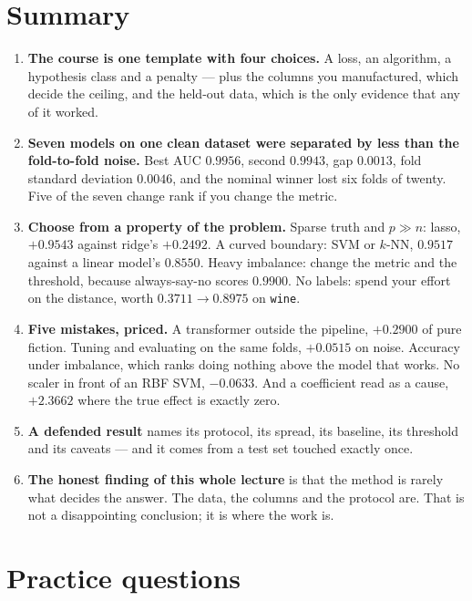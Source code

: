 \documentclass[11pt]{article}
\begin{document}
\section{Summary}
\label{sec:summary}

\begin{enumerate}[leftmargin=*]
  \item \textbf{The course is one template with four choices.} A loss, an
    algorithm, a hypothesis class and a penalty --- plus the columns you
    manufactured, which decide the ceiling, and the held-out data, which is
    the only evidence that any of it worked.
  \item \textbf{Seven models on one clean dataset were separated by less than
    the fold-to-fold noise.} Best AUC $0.9956$, second $0.9943$, gap
    $0.0013$, fold standard deviation $0.0046$, and the nominal winner lost
    six folds of twenty. Five of the seven change rank if you change the
    metric.
  \item \textbf{Choose from a property of the problem.} Sparse truth and
    $p \gg n$: lasso, $+0.9543$ against ridge's $+0.2492$. A curved boundary:
    SVM or $k$-NN, $0.9517$ against a linear model's $0.8550$. Heavy
    imbalance: change the metric and the threshold, because always-say-no
    scores $0.9900$. No labels: spend your effort on the distance, worth
    $0.3711 \to 0.8975$ on \texttt{wine}.
  \item \textbf{Five mistakes, priced.} A transformer outside the pipeline,
    $+0.2900$ of pure fiction. Tuning and evaluating on the same folds,
    $+0.0515$ on noise. Accuracy under imbalance, which ranks doing nothing
    above the model that works. No scaler in front of an RBF SVM,
    $-0.0633$. And a coefficient read as a cause, $+2.3662$ where the true
    effect is exactly zero.
  \item \textbf{A defended result} names its protocol, its spread, its
    baseline, its threshold and its caveats --- and it comes from a test set
    touched exactly once.
  \item \textbf{The honest finding of this whole lecture} is that the method
    is rarely what decides the answer. The data, the columns and the protocol
    are. That is not a disappointing conclusion; it is where the work is.
\end{enumerate}

\section{Practice questions}
\label{sec:practice}
\end{document}
